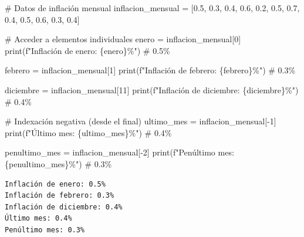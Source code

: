 \documentclass[
  doc,
  floatsintext,
  longtable,
  a4paper,
  nolmodern,
  notxfonts,
  notimes,
  12pt,
  colorlinks=true,linkcolor=blue,citecolor=blue,urlcolor=blue]{apa7}
\newenvironment{Shaded}{\begin{snugshade}}{\end{snugshade}}
\newcommand{\BuiltInTok}[1]{\textcolor[rgb]{0.00,0.23,0.31}{#1}}
\newcommand{\CommentTok}[1]{\textcolor[rgb]{0.37,0.37,0.37}{#1}}
\newcommand{\DecValTok}[1]{\textcolor[rgb]{0.68,0.00,0.00}{#1}}
\newcommand{\FloatTok}[1]{\textcolor[rgb]{0.68,0.00,0.00}{#1}}
\newcommand{\NormalTok}[1]{\textcolor[rgb]{0.00,0.23,0.31}{#1}}
\newcommand{\OperatorTok}[1]{\textcolor[rgb]{0.37,0.37,0.37}{#1}}
\newcommand{\SpecialCharTok}[1]{\textcolor[rgb]{0.37,0.37,0.37}{#1}}
\newcommand{\SpecialStringTok}[1]{\textcolor[rgb]{0.13,0.47,0.30}{#1}}
\begin{document}
\begin{Shaded}
\begin{Highlighting}[]
\CommentTok{\# Datos de inflación mensual}
\NormalTok{inflacion\_mensual }\OperatorTok{=}\NormalTok{ [}\FloatTok{0.5}\NormalTok{, }\FloatTok{0.3}\NormalTok{, }\FloatTok{0.4}\NormalTok{, }\FloatTok{0.6}\NormalTok{, }\FloatTok{0.2}\NormalTok{, }\FloatTok{0.5}\NormalTok{, }\FloatTok{0.7}\NormalTok{, }\FloatTok{0.4}\NormalTok{, }\FloatTok{0.5}\NormalTok{, }\FloatTok{0.6}\NormalTok{, }\FloatTok{0.3}\NormalTok{, }\FloatTok{0.4}\NormalTok{]}

\CommentTok{\# Acceder a elementos individuales}
\NormalTok{enero }\OperatorTok{=}\NormalTok{ inflacion\_mensual[}\DecValTok{0}\NormalTok{]}
\BuiltInTok{print}\NormalTok{(}\SpecialStringTok{f"Inflación de enero: }\SpecialCharTok{\{}\NormalTok{enero}\SpecialCharTok{\}}\SpecialStringTok{\%"}\NormalTok{)  }\CommentTok{\# 0.5\%}

\NormalTok{febrero }\OperatorTok{=}\NormalTok{ inflacion\_mensual[}\DecValTok{1}\NormalTok{]}
\BuiltInTok{print}\NormalTok{(}\SpecialStringTok{f"Inflación de febrero: }\SpecialCharTok{\{}\NormalTok{febrero}\SpecialCharTok{\}}\SpecialStringTok{\%"}\NormalTok{)  }\CommentTok{\# 0.3\%}

\NormalTok{diciembre }\OperatorTok{=}\NormalTok{ inflacion\_mensual[}\DecValTok{11}\NormalTok{]}
\BuiltInTok{print}\NormalTok{(}\SpecialStringTok{f"Inflación de diciembre: }\SpecialCharTok{\{}\NormalTok{diciembre}\SpecialCharTok{\}}\SpecialStringTok{\%"}\NormalTok{)  }\CommentTok{\# 0.4\%}

\CommentTok{\# Indexación negativa (desde el final)}
\NormalTok{ultimo\_mes }\OperatorTok{=}\NormalTok{ inflacion\_mensual[}\OperatorTok{{-}}\DecValTok{1}\NormalTok{]}
\BuiltInTok{print}\NormalTok{(}\SpecialStringTok{f"Último mes: }\SpecialCharTok{\{}\NormalTok{ultimo\_mes}\SpecialCharTok{\}}\SpecialStringTok{\%"}\NormalTok{)  }\CommentTok{\# 0.4\%}

\NormalTok{penultimo\_mes }\OperatorTok{=}\NormalTok{ inflacion\_mensual[}\OperatorTok{{-}}\DecValTok{2}\NormalTok{]}
\BuiltInTok{print}\NormalTok{(}\SpecialStringTok{f"Penúltimo mes: }\SpecialCharTok{\{}\NormalTok{penultimo\_mes}\SpecialCharTok{\}}\SpecialStringTok{\%"}\NormalTok{)  }\CommentTok{\# 0.3\%}
\end{Highlighting}
\end{Shaded}

\begin{verbatim}
Inflación de enero: 0.5%
Inflación de febrero: 0.3%
Inflación de diciembre: 0.4%
Último mes: 0.4%
Penúltimo mes: 0.3%
\end{verbatim}
\end{document}
